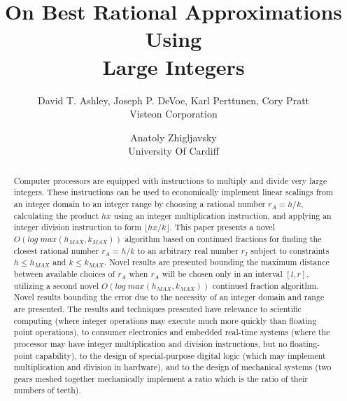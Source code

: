 \documentclass{esub2acm}
\begin{document}
\title{On Best Rational Approximations Using\\
       Large Integers}
\author{David T. Ashley, Joseph P. DeVoe, Karl Perttunen, Cory Pratt\\
        Visteon Corporation
        \and
        Anatoly Zhigljavsky\\
        University Of Cardiff}

\begin{abstract}
Computer processors are equipped with
instructions to multiply and divide very large integers.
These instructions can be used to economically implement linear scalings
from an integer domain to an integer range by choosing
a rational number $r_A = h/k$, calculating the product $hx$ using
an integer multiplication instruction, and applying an
integer division instruction to form $\lfloor{}hx/k\rfloor{}$.
This paper presents a novel $O(log \; max(h_{MAX}, k_{MAX}))$
algorithm based on continued fractions
for finding the closest rational number $r_A = h/k$ to an arbitrary
real number $r_I$ subject to constraints
$h \leq h_{MAX}$ and $k \leq k_{MAX}$.
Novel results are presented bounding the maximum distance between available
choices of $r_A$ when $r_A$ will be chosen only in an interval
$[l,r]$, utilizing a second novel
$O(log \; max(h_{MAX}, k_{MAX}))$
continued
fraction algorithm.  Novel results bounding the
error due to
the necessity of an integer domain and range are presented.
The results and
techniques presented have relevance to scientific
computing (where integer operations may execute much more quickly than
floating point operations), to consumer electronics and
embedded real-time systems (where the processor may have
integer multiplication and division instructions, but no
floating-point capability), to the design of special-purpose
digital logic (which may implement multiplication and division
in hardware), and to the design of mechanical
systems (two gears meshed together mechanically implement
a ratio which is the ratio of their numbers of teeth).
\end{abstract}
\end{document}
